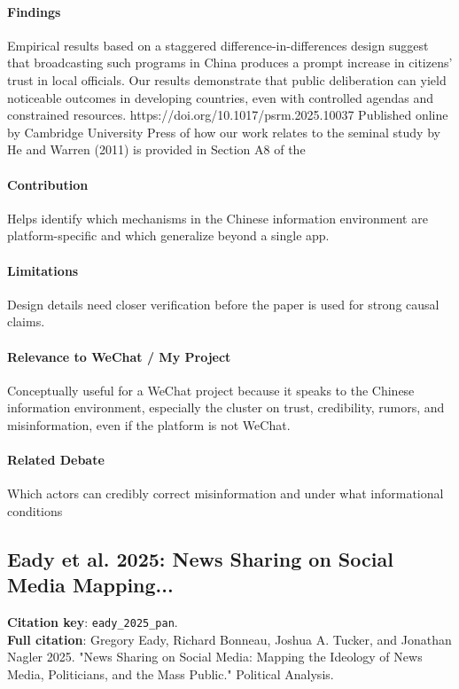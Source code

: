 \documentclass[12pt]{article}
\begin{document}
\paragraph{Findings} Empirical results based on a staggered difference-in-differences design suggest that broadcasting such programs in China produces a prompt increase in citizens' trust in local officials. Our results demonstrate that public deliberation can yield noticeable outcomes in developing countries, even with controlled agendas and constrained resources. https://doi.org/10.1017/psrm.2025.10037 Published online by Cambridge University Press of how our work relates to the seminal study by He and Warren (2011) is provided in Section A8 of the

\paragraph{Contribution} Helps identify which mechanisms in the Chinese information environment are platform-specific and which generalize beyond a single app.

\paragraph{Limitations} Design details need closer verification before the paper is used for strong causal claims.

\paragraph{Relevance to WeChat / My Project} Conceptually useful for a WeChat project because it speaks to the Chinese information environment, especially the cluster on trust, credibility, rumors, and misinformation, even if the platform is not WeChat.

\paragraph{Related Debate} Which actors can credibly correct misinformation and under what informational conditions


\subsection{Eady et al. 2025: News Sharing on Social Media Mapping...}
\textbf{Citation key}: \texttt{eady\_2025\_pan}.\\
\textbf{Full citation}: Gregory Eady, Richard Bonneau, Joshua A. Tucker, and Jonathan Nagler 2025. "News Sharing on Social Media: Mapping the Ideology of News Media, Politicians, and the Mass Public." Political Analysis.
\end{document}
